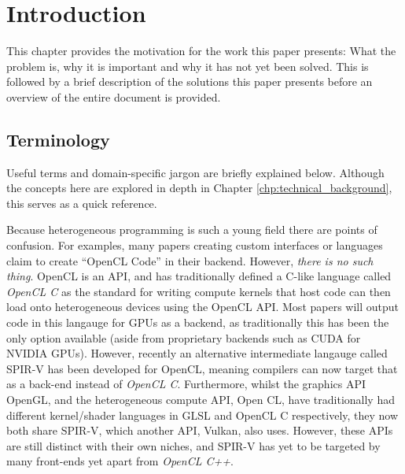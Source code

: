 \documentclass[a4paper,12pt,twoside,openright]{report}
\begin{document}
\pagestyle{empty}
\singlespacing

\onehalfspacing

\singlespacing


\setcounter{page}{0}
\pagestyle{plain}
\tableofcontents

\onehalfspacing


\chapter{Introduction}
\setcounter{page}{1}

This chapter provides the motivation for the work this paper presents: What the
problem is, why it is important and why it has not yet been solved. This is
followed by a brief description of the solutions this paper presents before an
overview of the entire document is provided.

\section{Terminology}

Useful terms and domain-specific jargon are briefly explained below. Although
the concepts here are explored in depth in Chapter
\ref{chp:technical_background}, this serves as a quick reference.

Because heterogeneous programming is such a young field there are points of
confusion. For examples, many papers creating custom interfaces or languages
claim to create ``OpenCL Code'' in their backend. However, \textit{there is no
such thing}. OpenCL is an API, and has traditionally defined a C-like language
called \textit{OpenCL C} as the standard for writing compute kernels that host
code can then load onto heterogeneous devices using the OpenCL API. Most papers
will output code in this langauge for GPUs as a backend, as traditionally this
has been the only option available (aside from proprietary backends such as
CUDA for NVIDIA GPUs). However, recently an alternative intermediate langauge
called SPIR-V has been developed for OpenCL, meaning compilers can now target
that as a back-end instead of \textit{OpenCL C}. Furthermore, whilst the
graphics API OpenGL, and the heterogeneous compute API, Open CL, have
traditionally had different kernel/shader languages in GLSL and OpenCL C
respectively, they now both share SPIR-V, which another API, Vulkan, also uses.
However, these APIs are still distinct with their own niches, and SPIR-V has
yet to be targeted by many front-ends yet apart from \textit{OpenCL C++}.
\end{document}

